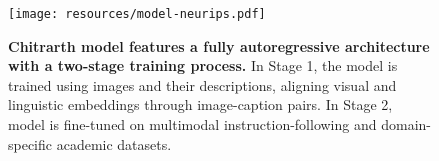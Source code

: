 

\begin{figure}[htb]
\begin{minipage}[b]{1.0\linewidth}
  \centering
\centerline{\texttt{[image: resources/model-neurips.pdf]}}
\end{minipage}
\caption{\textbf{Chitrarth model features a fully autoregressive architecture with a two-stage training process.} In Stage 1, the model is trained using images and their descriptions, aligning visual and linguistic embeddings through image-caption pairs. In Stage 2, model is fine-tuned on multimodal instruction-following and domain-specific academic datasets.}
\label{fig:model}
\end{figure}